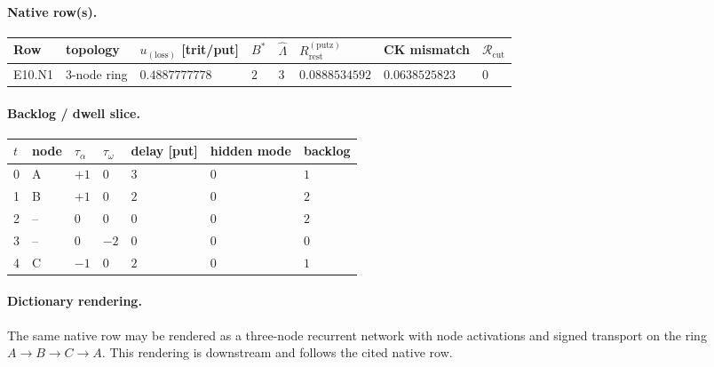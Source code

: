 \paragraph{Native row(s).}
{\footnotesize
\begin{center}
\begin{tabular}{@{}llllllll@{}}
\toprule
Row & topology & $u_{(\mathrm{loss})}$ [trit/put] & $B^*$ & $\widehat\Lambda$ & $R_{\mathrm{rest}}^{(\mathrm{putz})}$ & CK mismatch & $\mathcal R_{\mathrm{cut}}$ \\
\midrule
E10.N1 & 3-node ring & $0.4887777778$ & $2$ & $3$ & $0.0888534592$ & $0.0638525823$ & $0$ \\
\bottomrule
\end{tabular}
\end{center}}
\paragraph{Backlog / dwell slice.}
{\footnotesize
\begin{center}
\begin{tabular}{@{}lllllll@{}}
\toprule
$t$ & node & $\tau_\alpha$ & $\tau_\omega$ & delay [put] & hidden mode & backlog \\
\midrule
0 & A & $+1$ & $0$ & $3$ & $0$ & $1$ \\
1 & B & $+1$ & $0$ & $2$ & $0$ & $2$ \\
2 & -- & $0$ & $0$ & $0$ & $0$ & $2$ \\
3 & -- & $0$ & $-2$ & $0$ & $0$ & $0$ \\
4 & C & $-1$ & $0$ & $2$ & $0$ & $1$ \\
\bottomrule
\end{tabular}
\end{center}}
\paragraph{Dictionary rendering.} The same native row may be rendered as a three-node recurrent network with node activations and signed transport on the ring $A\to B\to C\to A$. This rendering is downstream and follows the cited native row.
\begin{center}
\end{center}
